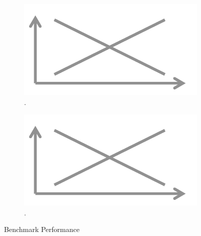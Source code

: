 \begin{figure}[h]
\centering
  \begin{subfigure}[t]{.48\columnwidth}
  \includegraphics[width = .95\columnwidth]{figures/placeholder}
  \caption{.}
  \label{f:tpcc} 
  \end{subfigure}
  \begin{subfigure}[t]{.48\columnwidth}
  \includegraphics[width = .95\columnwidth]{figures/placeholder}
  \caption{.}
  \label{f:auctionmark} 
  \end{subfigure}
  \caption{Benchmark Performance}

\end{figure}













